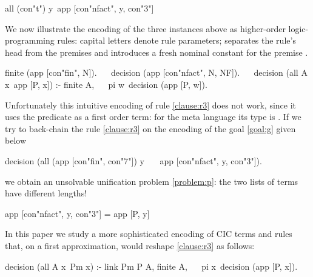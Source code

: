\documentclass[sigconf,natbib=false,review]{acmart}
\begin{document}
\begin{elpicode}
all (con"t") y\ app [con"nfact", y, con"3"]
\end{elpicode}

\noindent
We now illustrate the encoding of the three instances above as higher-order
logic-programming rules: capital letters denote rule
parameters; \elpiIn{:-} separates the rule's head from the premises and
 introduces a fresh nominal constant 
for the premise .

\begin{elpicode}
finite   (app [con"fin", N]).                         ~~
decision (app [con"nfact", N, NF]).                   ~~
decision (all A x\ app [P, x]) :- finite A,           ~~
  pi w\ decision (app [P, w]).
\end{elpicode}

\noindent
Unfortunately this intuitive encoding of rule \ref{clause:r3} does not work,
since it uses the predicate  as a first order term: for the meta
language its type is . If we try to back-chain the rule
\ref{clause:r3} on the encoding of the goal \ref{goal:g} given below

\begin{elpicode}
decision (all (app [con"fin", con"7"]) y\              ~~
  app [con"nfact", y, con"3"]).
\end{elpicode}

\noindent
we obtain an unsolvable unification problem \ref{problem:p}:
the two lists of terms have different lengths!

\begin{elpicode}
app [con"nfact", y, con"3"] = app [P, y]               ~~
\end{elpicode}

\noindent
In this paper we study a more sophisticated encoding of CIC terms and rules
that, on a first approximation, would reshape \ref{clause:r3} as follows:

\begin{elpicode}
decision (all A x\ Pm x) :- link Pm P A, finite A,    ~~
  pi x\ decision (app [P, x]).
\end{elpicode}
\end{document}

